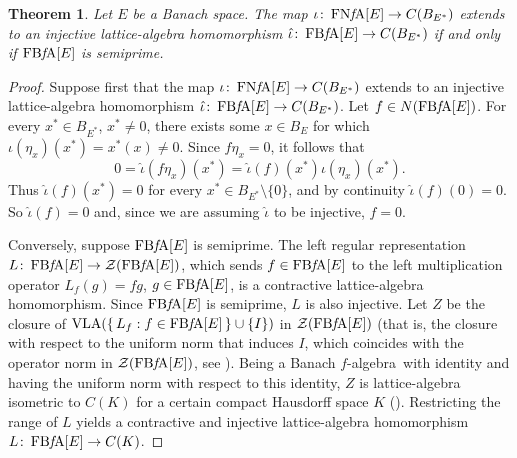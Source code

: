 \documentclass{memo-l}
\newtheorem{thm}[theorem]{Theorem}
\theoremstyle{definition}
\theoremstyle{remark}
\numberwithin{section}{chapter}
\numberwithin{equation}{chapter}
\newcommand{\falg}{$f\!$-algebra}
\newcommand{\VLA}{\operatorname{VLA}}
\newcommand{\FNFA}[1]{\operatorname{FN{\it f}\!A}[#1]}
\newcommand{\FBFA}[1]{\operatorname{FB{\it f}\!A}[#1]}
\begin{document}
\begin{thm}\label{thm:semiprime_iff_representable}
    Let $E$ be a Banach space. The map $\iota \colon \FNFA E\to
    C(B_{E^{*}})$ extends to an injective lattice-algebra homomorphism
    $\hat{\iota }\colon \FBFA E\to C(B_{E^{*}})$ if and only if $\FBFA E$ is semiprime.
\end{thm}
\begin{proof}
    Suppose first that the map $\iota \colon \FNFA E\to
    C(B_{E^{*}})$ extends to an injective
    lattice-algebra homomorphism $\hat{\iota }\colon \FBFA E\to
    C(B_{E^{*}})$. Let $f \in N(\FBFA E)$. For every $x^{*} \in
    B_{E^{*}}$, $x^{*}\neq 0$, there exists some $x \in B_{E}$ for
    which $\iota (\eta _x)(x^{*})=x^{*}(x)\neq 0$. Since $f\eta _x=0$, it
    follows that
    \[
    0=\hat{\iota }(f \eta _x)(x^{*})=\hat{\iota }(f)(x^{*})
    \iota (\eta _x)(x^{*}).
    \]
    Thus $\hat{\iota }(f)(x^{*})=0$ for every $x^{*}\in
    B_{E^{*}}\setminus \{0\}$, and by continuity $\hat{\iota }(f)(0)=0$. So $\hat{\iota } (f)=0$ and, since
    we are assuming $\hat{\iota }$ to be injective, $f=0$.

    Conversely, suppose $\FBFA E$ is semiprime. The left
    regular representation $L\colon \FBFA E\to \mathcal{Z}(\FBFA E)$,
    which sends $f \in \FBFA E$ to the left multiplication operator
    $L_f(g)=fg$, $g \in \FBFA E$, is a
    contractive lattice-algebra homomorphism. Since $\FBFA E$ is
    semiprime, $L$ is also injective. Let $Z$ be the closure
    of $\VLA(\{\, L_f : f \in \FBFA E \, \}\cup \{I\})$ in
    $\mathcal{Z}(\FBFA E)$ (that is, the closure with respect to the
    uniform norm that induces $I$, which coincides with the operator
    norm in $\mathcal{Z}(\FBFA E)$, see \cite{wickstead1977}). Being a Banach \falg\ with
    identity and having the uniform norm with respect to this
    identity, $Z$ is lattice-algebra isometric to $C(K)$ for a certain
    compact Hausdorff space $K$ (\cite{martignon1980}).
    Restricting the range of $L$ yields a contractive and injective
    lattice-algebra homomorphism $L\colon \FBFA E\to C(K)$.


\end{proof}
\end{document}

